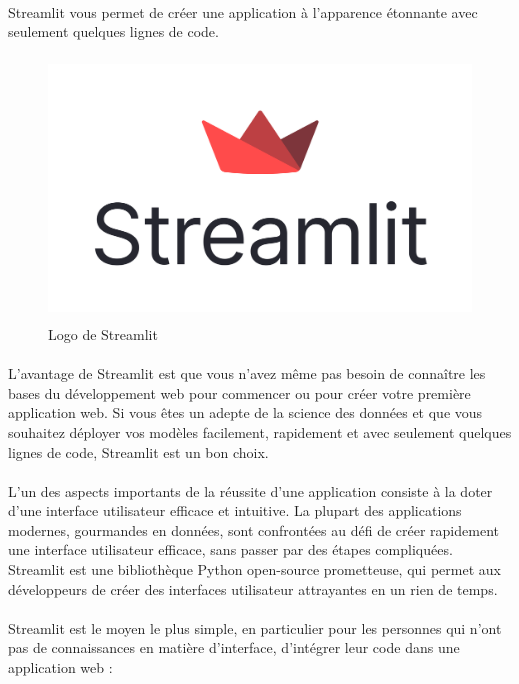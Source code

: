 \paragraph{}
Streamlit vous permet de créer une application à l'apparence étonnante avec seulement quelques lignes de code.
 \begin{figure}[h]
    \centering
    \includegraphics[width=\linewidth, height=7cm]{images/streamlit-logo-secondary-colormark-darktext.png}
    \caption{Logo de Streamlit} 
\end{figure}
 \paragraph{}
 L'avantage de Streamlit est que vous n'avez même pas besoin de connaître les bases du développement web pour commencer ou pour créer votre première application web. Si vous êtes un adepte de la science des données et que vous souhaitez déployer vos modèles facilement, rapidement et avec seulement quelques lignes de code, Streamlit est un bon choix.

 \paragraph{}
L'un des aspects importants de la réussite d'une application consiste à la doter d'une interface utilisateur efficace et intuitive. La plupart des applications modernes, gourmandes en données, sont confrontées au défi de créer rapidement une interface utilisateur efficace, sans passer par des étapes compliquées. Streamlit est une bibliothèque Python open-source prometteuse, qui permet aux développeurs de créer des interfaces utilisateur attrayantes en un rien de temps.

\paragraph{}
Streamlit est le moyen le plus simple, en particulier pour les personnes qui n'ont pas de connaissances en matière d'interface, d'intégrer leur code dans une application web :

